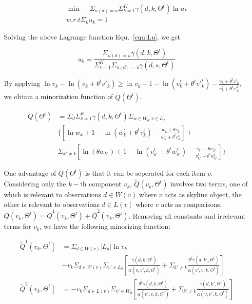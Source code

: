 \documentclass[sigconf]{acmart}
\begin{document}
\begin{align}\label{equ:Lu}
\min -\Sigma_{u(d)=u} \Sigma_{k=1}^K \gamma(d,k,\Theta^t) \ln u_k\\ \nonumber
w.r.t \Sigma_k u_k =1
\end{align}
 
Solving the above Lagrange function Equ.~\ref{equ:Lu}, we get 

\begin{equation}\label{equ:u}
u_k =\frac{\Sigma_{u(d)=u}\gamma(d,k,\Theta^t)}{\Sigma_{s=1}^K \Sigma_{u(d)=u}\gamma(d,s,\Theta^t)}
\end{equation}

By applying $\ln v_k - \ln (v_k + \theta^t v'_k) \geq \ln v_k + 1 - \ln (v_k^t + \theta^t {v'}_k^t) - \frac{v_k + \theta^t v'_k}{v_k^t + \theta^t {v'}_k^t}$, we obtain a minorization function of $\tilde{Q}(\Theta^t)$.

\begin{align}\label{equ:minorization}
\tilde{Q}(\Theta^t) &= \Sigma_d \Sigma_{k=1}^K \gamma(d,k,\Theta^t)  \Sigma_{w\in W_d, v\in L_d} \\\nonumber
& \{ [\ln w_k + 1 - \ln (w_k^t + \theta^t v_k^t) - \frac{w_k+\theta v_k}{w_k^t + \theta^tv_k^t}]+\\\nonumber
&\Sigma_{k'\neq k} [\ln (\theta w_{k'}) + 1 - \ln (v_{k'}^t + \theta^t w_{k'}^t) -  \frac{v_{k'}+\theta w_{k'}}{v_{k'}^t + \theta^tw_{k'}^t}]
\}
\end{align}

One advantage of $\tilde{Q}(\Theta^t)$ is that it can be seperated for each item $v$. Considering only the $k-$th component $v_k$, $\tilde{Q}(v_k,\Theta^t)$ involves two terms, one of which is relevant to observations $d\in W(v)$ where $v$ acts as skyline object, the other is relevant to observations $d \in L(v)$ where $v$ acts as comparisons, $\tilde{Q}(v_k,\Theta^t)=\tilde{Q}^1(v_k,\Theta^t)+\tilde{Q}^2(v_k,\Theta^t)$. Removing all constants and irrelevant terms for $v_k$, we have the following minorizing function:

\begin{align*}%
\tilde{Q}^1(v_k,\Theta^t) & = \Sigma_{d\in W(v)} |L_d| \ln v_k \\\nonumber
& -v_k\Sigma_{d\in W(v)}\Sigma_{v'\in L_d} [\frac{\gamma(d,k,\Theta^t)}{ \alpha(v,v',k,\Theta^t)} +\Sigma_{k'\neq k}\frac{\theta^t\gamma(d,k',\Theta^t)}{\alpha(v',v,k,\Theta^t)}]\\ \nonumber
\tilde{Q}^2(v_k,\Theta^t) & = -v_k \Sigma_{d\in L(v)}\Sigma_{v'\in W_d} [\frac{\theta^t \gamma(d,k,\Theta^t)}{\alpha(v',v,k,\Theta^t)}+\Sigma_{k'\neq k} \frac{\gamma(d,k',\Theta^t)}{\alpha(v,v',k,\Theta^t)}] 
\end{align*}
\end{document}
